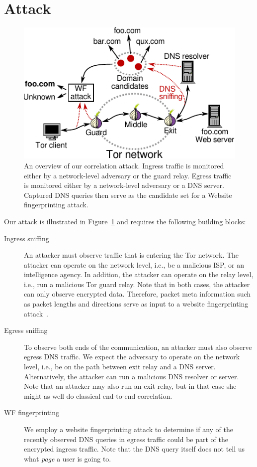 \section{Attack}\label{sec:attack}

\begin{figure}[t]
	\centering
	\includegraphics[width=\linewidth]{figures/attack-scenario.pdf}
	\caption{An overview of our correlation attack.  Ingress traffic is
	monitored either by a network-level adversary or the guard relay.  Egress
	traffic is monitored either by a network-level adversary or a DNS server.
	Captured DNS queries then serve as the candidate set for a Website
	fingerprinting attack.}
	\label{fig:attack-scenario}
\end{figure}

Our attack is illustrated in Figure~\ref{fig:attack-scenario} and requires the
following building blocks:
\begin{description}
	\item[Ingress sniffing] An attacker must observe traffic that is entering
		the Tor network.  The attacker can operate on the network level, i.e.,
		be a malicious ISP, or an intelligence agency.  In addition, the
		attacker can operate on the relay level, i.e., run a malicious Tor guard
		relay.  Note that in both cases, the attacker can only observe encrypted
		data.  Therefore, packet meta information such as packet lengths and
		directions serve as input to a website fingerprinting
		attack~\cite{Panchenko2016a}.
	\item[Egress sniffing] To observe both ends of the communication, an
		attacker must also observe egress DNS traffic.  We expect the adversary
		to operate on the network level, i.e., be on the path between exit relay
		and a DNS server.  Alternatively, the attacker can run a malicious DNS
		resolver or server.  Note that an attacker may also run an exit relay,
		but in that case she might as well do classical end-to-end correlation.
	\item[WF fingerprinting] We employ a website fingerprinting attack to
		determine if any of the recently observed DNS queries in egress traffic
		could be part of the encrypted ingress traffic.  Note that the DNS query
		itself does not tell us what \emph{page} a user is going to.
\end{description}


